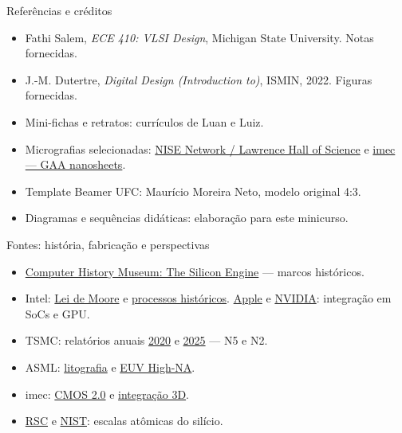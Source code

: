 \begin{frame}{Referências e créditos}
\small\begin{itemize}\item Fathi Salem, \textit{ECE 410: VLSI Design}, Michigan State University. Notas fornecidas.
\item J.-M. Dutertre, \textit{Digital Design (Introduction to)}, ISMIN, 2022. Figuras fornecidas.
\item Mini-fichas e retratos: currículos de Luan e Luiz.
\item Micrografias selecionadas: \href{https://www.nisenet.org/catalog/media/zoom_microchip_video}{NISE Network / Lawrence Hall of Science} e \href{https://www.imec-int.com/en/articles/outer-wall-forksheet-bridge-nanosheet-and-cfet-device-architectures-logic-technology}{imec — GAA nanosheets}.
\item Template Beamer UFC: Maurício Moreira Neto, modelo original 4:3.
\item Diagramas e sequências didáticas: elaboração para este minicurso.\end{itemize}
\end{frame}
\begin{frame}{Fontes: história, fabricação e perspectivas}
\small\begin{itemize}
\item \href{https://www.computerhistory.org/siliconengine/timeline/}{Computer History Museum: The Silicon Engine} — marcos históricos.
\item Intel: \href{https://www.intel.com/content/www/us/en/newsroom/resources/moores-law.htm}{Lei de Moore} e \href{https://www.intel.com/pressroom/kits/quickreffam.htm}{processos históricos}. \href{https://www.apple.com/newsroom/2024/05/apple-introduces-m4-chip/}{Apple} e \href{https://developer.nvidia.com/blog/nvidia-ampere-architecture-in-depth/}{NVIDIA}: integração em SoCs e GPU.
\item TSMC: relatórios anuais \href{https://investor.tsmc.com/static/annualReports/2020/english/index.html}{2020} e \href{https://investor.tsmc.com/static/annualReports/2025/english/index.html}{2025} — N5 e N2.
\item ASML: \href{https://www.asml.com/en/technology/lithography-principles}{litografia} e \href{https://www.asml.com/en/company/stories/2024/5-things-high-na-euv}{EUV High-NA}.
\item imec: \href{https://www.imec-int.com/en/articles/cmos-20-revolution}{CMOS 2.0} e \href{https://www.imec-int.com/en/articles/path-high-density-front-and-backside-wafer-connectivity}{integração 3D}.
\item \href{https://periodic-table.rsc.org/element/14/silicon}{RSC} e \href{https://www.nist.gov/publications/certification-standard-reference-materialr-640g-line-position-and-line-shape-standard}{NIST}: escalas atômicas do silício.
\end{itemize}
\end{frame}

